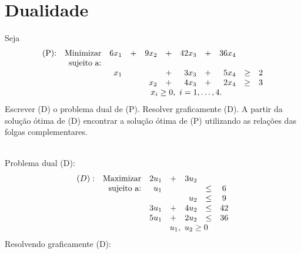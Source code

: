 \documentclass[12pt]{exam}
\begin{document}
\section*{Dualidade}

\begin{questions}

\question Seja
	\begin{equation*}
		  \begin{array}{crrrrrrrrcc}
 \text{(P):} & \text{Minimizar} & 6x_1 & + & 9x_2 & + & 42x_3 & + & 36x_4   &      & \\   
  	   & \text{sujeito a:}&        &   &      &   & &  & &  & \\
  	   &                 &  x_1 &     &         & + & 3x_3 & + & 5x_4    &  \geq & 2 \\
  	   &                &         &     &   x_2& + & 4x_3 & + & 2x_4    & \geq& 3\\
  	   &                 &   \multicolumn{9}{c}{x_i \geq 0,~ i=1,\dots,4.}      
		  \end{array}	
	\end{equation*}
Escrever (D) o problema dual de (P). Resolver graficamente (D). A partir da solução ótima de (D) encontrar a solução ótima de (P) utilizando as relações das folgas complementares.
	\begin{solution}\\
	Problema dual (D):\\
	\begin{equation*}	
				\begin{array}{c r r c r c c }
			(D) :&  \text{Maximizar}   & 2u_1 & +  & 3u_2 \\
			& \text{sujeito a:} & u_1   &    &           & \leq   & 6 \\
			&                           &          &    & u_2    & \leq   & 9 \\
			&                           & 3u_1 & + & 4u_2  & \leq  & 42 \\
			&                           & 5u_1 & + &  2u_2 & \leq   &  36 \\			
			&                           & \multicolumn{5}{c}{u_1,~u_2 \geq 0}
			\end{array}
	\end{equation*}
	Resolvendo graficamente (D):\\

\end{solution}
\end{questions}
\end{document}
